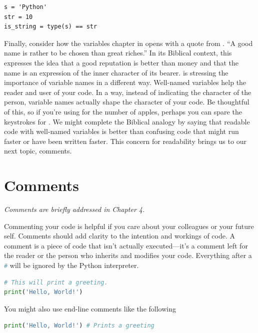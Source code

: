 \begin{lstlisting}
s = 'Python'
str = 10
is_string = type(s) == str
\end{lstlisting}


Finally, consider how the variables chapter in \cite{lubanovic2019introducing} opens with a quote from . ``A good name is rather to be chosen than great riches.'' In its Biblical context, this expresses the idea that a good reputation is better than money and that the name is an expression of the inner character of its bearer. \cite{lubanovic2019introducing} is stressing the importance of variable names in a different way. Well-named variables help the reader and user of your code. In a way, instead of indicating the character of the person, variable names actually shape the character of your code. Be thoughtful of this, so if you're using  for the number of apples, perhaps you can spare the keystrokes for . We might complete the Biblical analogy by saying that readable code with well-named variables is better than confusing code that might run faster or have been written faster. This concern for readability brings us to our next topic, comments. 


\section{Comments}
\noindent \textit{Comments are briefly addressed in \cite{lubanovic2019introducing} Chapter 4.}

Commenting your code is helpful if you care about your colleagues or your future self. Comments should add clarity to
the intention and workings of code. A comment is a piece of code that isn't actually executed---it's a comment left for the reader or the person who inherits and modifies your code.
Everything after a \lstinline[language = Python]{#} will be ignored by the Python interpreter.

\begin{lstlisting}[language = Python]
# This will print a greeting.
print('Hello, World!') \end{lstlisting}

\smallskip
 You might also use end-line comments like the following

\begin{lstlisting}[language = Python]
print('Hello, World!') # Prints a greeting \end{lstlisting}

